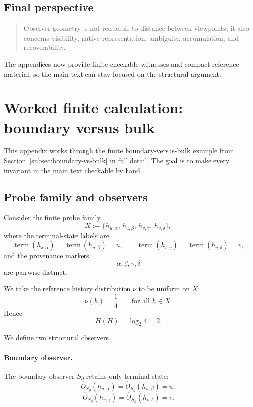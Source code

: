 \documentclass[11pt,twoside]{article}
\theoremstyle{definition}
\begin{document}
\subsection{Final perspective}
\label{subsec:final-perspective}

\begin{quote}
Observer geometry is not reducible to distance between viewpoints; it also concerns visibility, native representation, ambiguity, accumulation, and recoverability.
\end{quote}

The appendices now provide finite checkable witnesses and compact reference material, so the main text can stay focused on the structural argument.
\appendix

\section{Worked finite calculation: boundary versus bulk}
\label{app:boundary-bulk}

This appendix works through the finite boundary-versus-bulk example from Section~\ref{subsec:boundary-vs-bulk} in full detail. The goal is to make every invariant in the main text checkable by hand.

\subsection{Probe family and observers}
\label{app:boundary-bulk-setup}

Consider the finite probe family
\[
  X
  :=
  \{
    h_{u,\alpha},\,
    h_{u,\beta},\,
    h_{v,\gamma},\,
    h_{v,\delta}
  \},
\]
where the terminal-state labels are
\[
  \operatorname{term}(h_{u,\alpha})
  =
  \operatorname{term}(h_{u,\beta})
  =
  u,
  \qquad
  \operatorname{term}(h_{v,\gamma})
  =
  \operatorname{term}(h_{v,\delta})
  =
  v,
\]
and the provenance markers
\[
  \alpha,\beta,\gamma,\delta
\]
are pairwise distinct.

We take the reference history distribution \(\nu\) to be uniform on \(X\):
\[
  \nu(h)=\frac14
  \qquad
  \text{for all } h\in X.
\]
Hence
\[
  H(H)=\log_2 4 = 2.
\]

We define two structural observers.

\paragraph{Boundary observer.}
The boundary observer \(S_{\partial}\) retains only terminal state:
\[
  \widehat{O}_{S_{\partial}}(h_{u,\alpha})
  =
  \widehat{O}_{S_{\partial}}(h_{u,\beta})
  =
  u,
\]
\[
  \widehat{O}_{S_{\partial}}(h_{v,\gamma})
  =
  \widehat{O}_{S_{\partial}}(h_{v,\delta})
  =
  v.
\]
\end{document}
